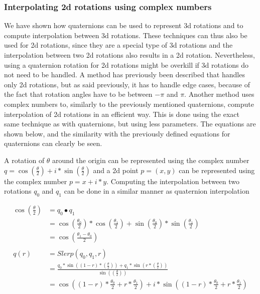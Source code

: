 \subsubsection{Interpolating 2d rotations using complex numbers}

We have shown how quaternions can be used to represent 3d rotations and to compute interpolation between 3d rotations. These techniques can thus also be used for 2d rotations, since they are a special type of 3d rotations and the interpolation between two 2d rotations also results in a 2d rotation. Nevertheless, using a quaternion rotation for 2d rotations might be overkill if 3d rotations do not need to be handled. A method has previously been described that handles only 2d rotations, but as said previously, it has to handle edge cases, because of the fact that rotation angles have to be between \( - \pi \) and \( \pi \). Another method uses complex numbers to, similarly to the previously mentioned quaternions, compute interpolation of 2d rotations in an efficient way. This is done using the exact same technique as with quaternions, but using less parameters. The equations are shown below, and the similarity with the previously defined equations for quaternions can clearly be seen.

A rotation of $\theta$ around the origin can be represented using the complex number \( q = \cos(\frac{\theta}{2}) + i*\sin(\frac{\theta}{2}) \) and a 2d point \( p = (x, y) \) can be represented using the complex number \( p = x + i*y \). Computing the interpolation between two rotations \( q_0 \) and \( q_1 \) can be done in a similar manner as quaternion interpolation

\begin{equation}
\begin{split}
\cos(\frac{\theta}{2})  &= q_0 \bullet q_1 \\
                        &= \cos(\frac{\theta_0}{2})*\cos(\frac{\theta_1}{2}) + \sin(\frac{\theta_0}{2})*\sin(\frac{\theta_1}{2}) \\
                        &= \cos(\frac{\theta_1 - \theta_0}{2}) \\
                        & \\
q(r)                &= Slerp(q_0, q_1, r) \\
                &= \frac{q_0 * \sin((1-r)*(\frac{\theta}{2})) + q_1 * \sin(r*(\frac{\theta}{2}))}{\sin((\frac{\theta}{2}))} \\
                &= \cos((1-r)*\frac{\theta_0}{2} + r*\frac{\theta_1}{2}) + i*\sin((1-r)*\frac{\theta_0}{2} + r*\frac{\theta_1}{2}) \\
\end{split}
\end{equation}

